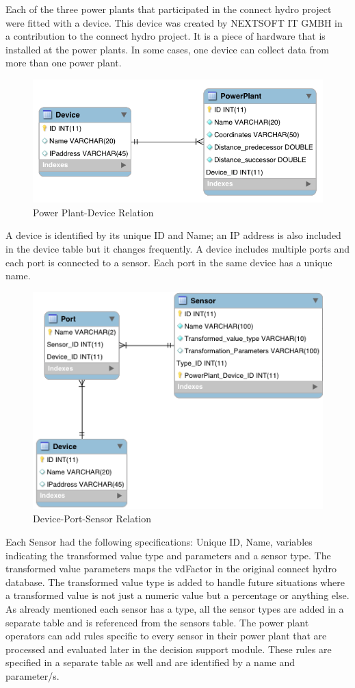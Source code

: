 Each of the three power plants that participated in the connect hydro project were fitted with a device. This device was created by NEXTSOFT IT GMBH in a contribution to the connect hydro project. It is a piece of hardware that is installed at the power plants. In some cases, one device can collect data from more than one power plant.
\begin{figure}[H]
\centering
\includegraphics[scale=0.4]{Images/Device-Powerplant.png}
\caption[Power Plant-Device Relation]{Power Plant-Device Relation}
\end{figure}
A device is identified by its unique ID and Name; an IP address is also included in the device table but it changes frequently. A device includes multiple ports and each port is connected to a sensor. Each port in the same device has a unique name. 
\begin{figure}[H]
\centering
\includegraphics[scale=0.6]{Images/Device-Port-Sensor.png}
\caption[Device-Port-Sensor Relation]{Device-Port-Sensor Relation}
\end{figure}
Each Sensor had the following specifications: Unique ID, Name, variables indicating the transformed value type and parameters and a sensor type. The transformed value parameters maps the vdFactor in the original connect hydro database. The transformed value type is added to handle future situations where a transformed value is not just a numeric value but a percentage or anything else. As already mentioned each sensor has a type, all the sensor types are added in a separate table and is referenced from the sensors table. The power plant operators can add rules specific to every sensor in their power plant that are processed and evaluated later in the decision support module. These rules are specified in a separate table as well and are identified by a name and parameter/s.
